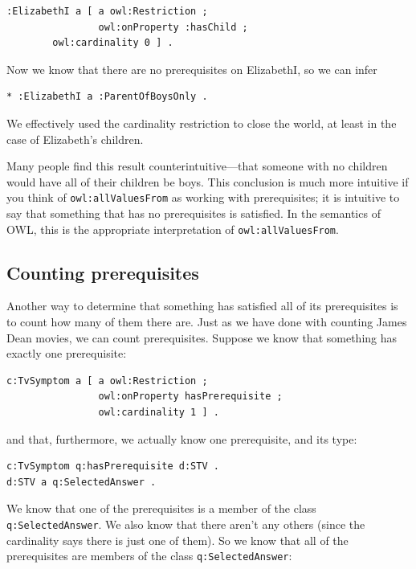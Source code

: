 \begin{lstlisting}
:ElizabethI a [ a owl:Restriction ;
                owl:onProperty :hasChild ;
		owl:cardinality 0 ] .
\end{lstlisting}

Now we know that there are no prerequisites on ElizabethI, so we can
infer

\begin{lstlisting}
* :ElizabethI a :ParentOfBoysOnly .
\end{lstlisting}

We effectively used the cardinality restriction to close the world, at
least in the case of Elizabeth's children.

Many people find this result counterintuitive---that someone with no
children would have all of their children be boys. This conclusion is
much more intuitive if you think of \texttt{owl:allValuesFrom} as working with
prerequisites; it is intuitive to say that something that has no
prerequisites is satisfied. In the semantics of OWL, this is the
appropriate interpretation of \texttt{owl:allValuesFrom}.

\subsection{Counting prerequisites}

Another way to determine that something has satisfied all of its
prerequisites is to count how many of them there are. Just as we have
done with counting James Dean movies, we can count prerequisites.
Suppose we know that something has exactly one prerequisite:

\begin{lstlisting}
c:TvSymptom a [ a owl:Restriction ;
                owl:onProperty hasPrerequisite ;
                owl:cardinality 1 ] .
\end{lstlisting}

and that, furthermore, we actually know one prerequisite, and its type:

\begin{lstlisting}
c:TvSymptom q:hasPrerequisite d:STV .
d:STV a q:SelectedAnswer .
\end{lstlisting}

We know that one of the prerequisites is a member of the class
\texttt{q:SelectedAnswer}. We also know that there aren't any others (since the
cardinality says there is just one of them). So we know that all of the
prerequisites are members of the class \texttt{q:SelectedAnswer}:

